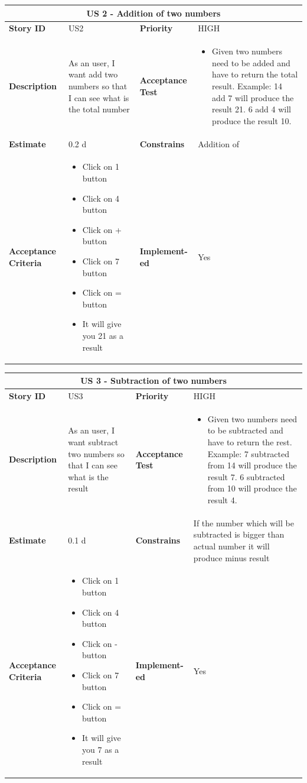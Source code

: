 \documentclass{article}
\begin{document}
\begin{tabular}{ |p{2cm}|p{5cm}|p{2cm}|p{4cm}| }
 \hline
 \multicolumn{4}{|c|}{US 2 - Addition of two numbers} \\
 \hline
 \textbf {Story ID}& US2 &  \textbf{Priority} & HIGH \\
 \hline
  \textbf{Description}   & As an user, I want add two numbers so that I can see what is the total number &    \textbf{Acceptance Test}& 
\begin{itemize}
\item Given two numbers need to be added and have to return the total result. Example: 14 add 7 will produce the result 21. 6 add 4 will produce the result 10. 
\end{itemize}
  \\
 \hline
 \textbf{Estimate} & 0.2 d &  \textbf{Constrains}&   Addition of \\
 \hline
 \textbf{Acceptance Criteria} & 
 \begin{itemize}
\item Click on 1 button
\item Click on 4 button
\item Click on + button
\item Click on 7 button
\item Click on = button
\item It will give you 21 as a result 
\end{itemize}
 &  \textbf{Implement- ed}& Yes  \\
 \hline
\end{tabular}

\begin{tabular}{ |p{2cm}|p{5cm}|p{2cm}|p{4cm}| }
 \hline
 \multicolumn{4}{|c|}{US 3 - Subtraction of two numbers} \\
 \hline
 \textbf {Story ID}& US3 &  \textbf{Priority} & HIGH \\
 \hline
  \textbf{Description}   & As an user, I want subtract two numbers so that I can see what is the result &    \textbf{Acceptance Test}& 
\begin{itemize}
\item Given two numbers need to be subtracted and have to return the rest. Example: 7 subtracted from 14 will produce the result 7. 6 subtracted from 10 will produce the result 4. 
\end{itemize}
  \\
 \hline
 \textbf{Estimate} & 0.1 d &  \textbf{Constrains}&  If the number which will be subtracted is bigger than actual number it will produce minus result  \\
 \hline
 \textbf{Acceptance Criteria} & 
 \begin{itemize}
\item Click on 1 button
\item Click on 4 button
\item Click on - button
\item Click on 7 button
\item Click on = button
\item It will give you 7 as a result 
\end{itemize}
 &  \textbf{Implement- ed}& Yes  \\
 \hline
\end{tabular}
\end{document}
